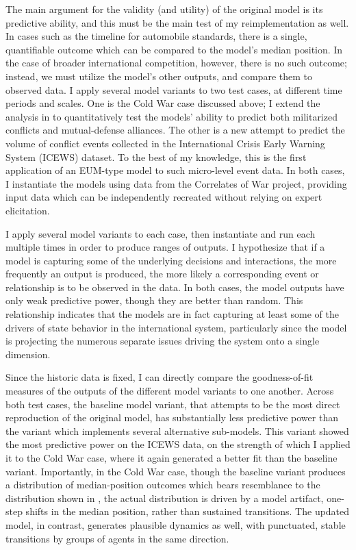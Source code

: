 The main argument for the validity (and utility) of the original model is its predictive ability, and this must be the main test of my reimplementation as well. In cases such as the timeline for automobile standards, there is a single, quantifiable outcome which can be compared to the model's median position. In the case of broader international competition, however, there is no such outcome; instead, we must utilize the model's other outputs, and compare them to observed data. I apply several model variants to two test cases, at different time periods and scales. One is the Cold War case discussed above; I extend the analysis in \citet{bdm_1998} to quantitatively test the models' ability to predict both militarized conflicts and mutual-defense alliances. The other is a new attempt to predict the volume of conflict events collected in the International Crisis Early Warning System (ICEWS) dataset. To the best of my knowledge, this is the first application of an EUM-type model to such micro-level event data. In both cases, I instantiate the models using data from the Correlates of War project, providing input data which can be independently recreated without relying on expert elicitation.

I apply several model variants to each case, then instantiate and run each multiple times in order to produce ranges of outputs. I hypothesize that if a model is capturing some of the underlying decisions and interactions, the more frequently an output is produced, the more likely a corresponding event or relationship is to be observed in the data.  In both cases, the model outputs have only weak predictive power, though they are better than random. This relationship indicates that the models are in fact capturing at least some of the drivers of state behavior in the international system, particularly since the model is projecting the numerous separate issues driving the system onto a single dimension.

Since the historic data is fixed, I can directly compare the goodness-of-fit measures of the outputs of the different model variants to one another. Across both test cases, the baseline model variant, that attempts to be the most direct reproduction of the original model, has substantially less predictive power than the variant which implements several alternative sub-models. This variant showed the most predictive power on the ICEWS data, on the strength of which I applied it to the Cold War case, where it again generated a better fit than the baseline variant. Importantly, in the Cold War case, though the baseline variant produces a distribution of median-position outcomes which bears resemblance to the distribution shown in \citet{bdm_1998}, the actual distribution is driven by a model artifact, one-step shifts in the median position, rather than sustained transitions. The updated model, in contrast, generates plausible dynamics as well, with punctuated, stable transitions by groups of agents in the same direction.

